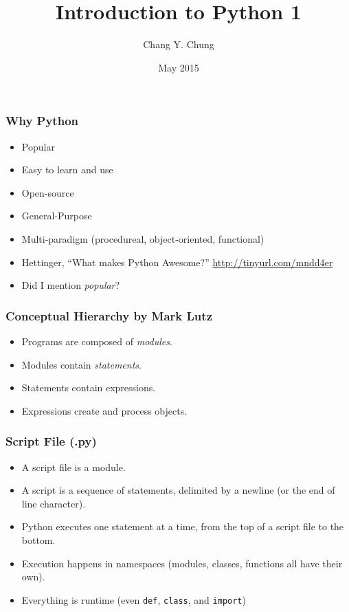 \documentclass{beamer}
\begin{document}
\title{Introduction to Python 1}
\date{May 2015}
\author{Chang Y. Chung}

{
\begin{frame}[noframenumbering]
\titlepage
\end{frame}}

\begin{frame}[fragile]
\frametitle{Why Python}
\begin{itemize}
\item Popular
\item Easy to learn and use
\item Open-source
\item General-Purpose
\item Multi-paradigm (procedureal, object-oriented, functional) 
\item Hettinger, ``What makes Python Awesome?''\cite{Hettinger2013}
      \url{http://tinyurl.com/mndd4er}
\item Did I mention \emph{popular}?
\end{itemize}
\end{frame}

\begin{frame}[fragile]
\frametitle{Conceptual Hierarchy by Mark Lutz\cite{Lutz2013}}
\begin{itemize}
\item<1-> Programs are composed of \emph{modules}.
\item<1-> Modules contain \emph{statements}.
\item<2-> Statements contain expressions.
\item<2-> Expressions create and process objects.
\end{itemize}
\end{frame}

\begin{frame}[fragile]
\frametitle{Script File (.py)}
\begin{itemize}
\item<1-> A script file is a module.
\item<1-> A script is a sequence of statements, delimited
      by a newline (or the end of line character).
\item<1-> Python executes one statement at a time, from 
      the top of a script file to the bottom.
\item<2-> Execution happens in namespaces (modules,
      classes, functions all have their own). 
\item<2-> Everything is runtime (even \lstinline{def},
      \lstinline{class}, and \lstinline{import})
\end{itemize}
\end{frame}
\end{document}
